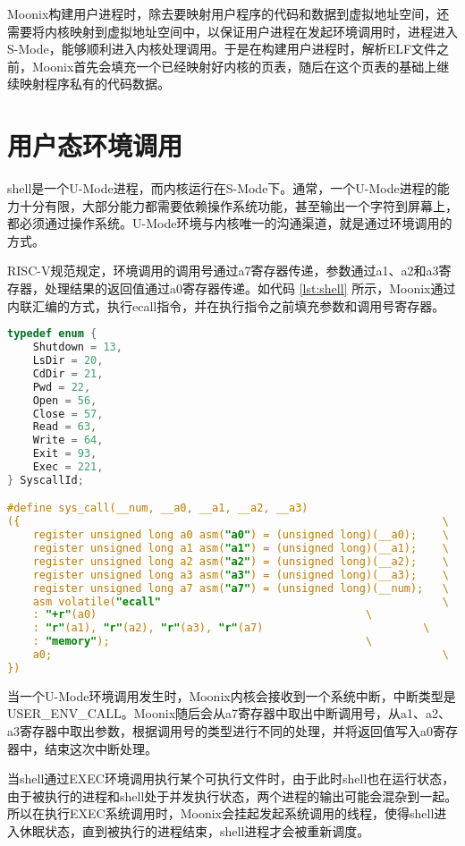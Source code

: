 Moonix构建用户进程时，除去要映射用户程序的代码和数据到虚拟地址空间，还需要将内核映射到虚拟地址空间中，以保证用户进程在发起环境调用时，进程进入S-Mode，能够顺利进入内核处理调用。于是在构建用户进程时，解析ELF文件之前，Moonix首先会填充一个已经映射好内核的页表，随后在这个页表的基础上继续映射程序私有的代码数据。

\section{用户态环境调用}

shell是一个U-Mode进程，而内核运行在S-Mode下。通常，一个U-Mode进程的能力十分有限，大部分能力都需要依赖操作系统功能，甚至输出一个字符到屏幕上，都必须通过操作系统。U-Mode环境与内核唯一的沟通渠道，就是通过环境调用的方式。

RISC-V规范规定，环境调用的调用号通过a7寄存器传递，参数通过a1、a2和a3寄存器，处理结果的返回值通过a0寄存器传递。如代码 \ref{lst:shell} 所示，Moonix通过内联汇编的方式，执行ecall指令，并在执行指令之前填充参数和调用号寄存器。

\begin{minipage}[c]{0.95\textwidth}
\begin{lstlisting}[language={C}, caption={U-Mode环境调用}, label={lst:shell}]
typedef enum {
	Shutdown = 13,
	LsDir = 20,
	CdDir = 21,
	Pwd = 22,
	Open = 56,
	Close = 57,
	Read = 63,
	Write = 64,
	Exit = 93,
	Exec = 221,
} SyscallId;

#define sys_call(__num, __a0, __a1, __a2, __a3)                          \
({                                                                  \
	register unsigned long a0 asm("a0") = (unsigned long)(__a0);    \
	register unsigned long a1 asm("a1") = (unsigned long)(__a1);    \
	register unsigned long a2 asm("a2") = (unsigned long)(__a2);    \
	register unsigned long a3 asm("a3") = (unsigned long)(__a3);    \
	register unsigned long a7 asm("a7") = (unsigned long)(__num);   \
	asm volatile("ecall"                                            \
	: "+r"(a0)                                          \
	: "r"(a1), "r"(a2), "r"(a3), "r"(a7)                         \
	: "memory");                                        \
	a0;                                                             \
})
\end{lstlisting}
\end{minipage}

当一个U-Mode环境调用发生时，Moonix内核会接收到一个系统中断，中断类型是USER\_ENV\_CALL。Moonix随后会从a7寄存器中取出中断调用号，从a1、a2、a3寄存器中取出参数，根据调用号的类型进行不同的处理，并将返回值写入a0寄存器中，结束这次中断处理。

当shell通过EXEC环境调用执行某个可执行文件时，由于此时shell也在运行状态，由于被执行的进程和shell处于并发执行状态，两个进程的输出可能会混杂到一起。所以在执行EXEC系统调用时，Moonix会挂起发起系统调用的线程，使得shell进入休眠状态，直到被执行的进程结束，shell进程才会被重新调度。


